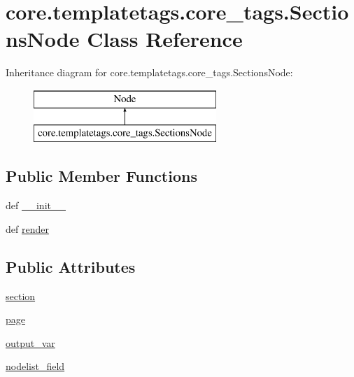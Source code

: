 \hypertarget{classcore_1_1templatetags_1_1core__tags_1_1SectionsNode}{\section{core.\-templatetags.\-core\-\_\-tags.\-Sections\-Node Class Reference}
\label{classcore_1_1templatetags_1_1core__tags_1_1SectionsNode}
}
Inheritance diagram for core.\-templatetags.\-core\-\_\-tags.\-Sections\-Node\-:\begin{figure}[H]
\begin{center}
\leavevmode
\includegraphics[height=2.000000cm]{classcore_1_1templatetags_1_1core__tags_1_1SectionsNode}
\end{center}
\end{figure}
\subsection*{Public Member Functions}
\begin{DoxyCompactItemize}
\item 
def \hyperlink{classcore_1_1templatetags_1_1core__tags_1_1SectionsNode_a715af6c362732ace4353c5194eba6872}{\-\_\-\-\_\-init\-\_\-\-\_\-}
\item 
def \hyperlink{classcore_1_1templatetags_1_1core__tags_1_1SectionsNode_a802e2701690f2a4e6a27dee4964e23d9}{render}
\end{DoxyCompactItemize}
\subsection*{Public Attributes}
\begin{DoxyCompactItemize}
\item 
\hyperlink{classcore_1_1templatetags_1_1core__tags_1_1SectionsNode_a03036dd42e3c41e6e861188adb81ea57}{section}
\item 
\hyperlink{classcore_1_1templatetags_1_1core__tags_1_1SectionsNode_a1f38a0010f2b78a29cf04ba071f4edec}{page}
\item 
\hyperlink{classcore_1_1templatetags_1_1core__tags_1_1SectionsNode_a5271892d91e1feed9afae8efd635e413}{output\-\_\-var}
\item 
\hyperlink{classcore_1_1templatetags_1_1core__tags_1_1SectionsNode_ae4ce1976f4351eacbed3ae92631dff1f}{nodelist\-\_\-field}
\end{DoxyCompactItemize}



